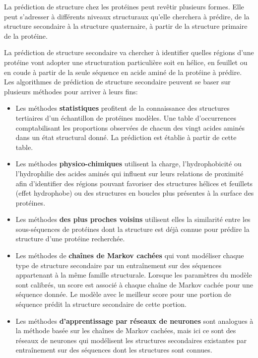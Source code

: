 La prédiction de structure chez les protéines peut revêtir plusieurs formes. Elle peut s'adresser à différents niveaux structuraux qu'elle cherchera à prédire, de la structure secondaire à la structure quaternaire, à partir de la structure primaire de la protéine.

La prédiction de structure secondaire va chercher à identifier quelles régions d'une protéine vont adopter une structuration particulière soit en hélice, en feuillet ou en coude à partir de la seule séquence en acide aminé de la protéine à prédire. Les algorithmes de prédiction de structure secondaire peuvent se baser sur plusieurs méthodes pour arriver à leurs fins:

\begin{itemize}
	\item Les méthodes \textbf{statistiques} profitent de la connaissance des structures tertiaires d'un échantillon de protéines modèles. Une table d'occurrences comptabilisant les proportions observées de chacun des vingt acides aminés dans un état structural donné. La prédiction est établie à partir de cette table.
	\item Les méthodes \textbf{physico-chimiques} utilisent la charge, l'hydrophobicité ou l'hydrophilie des acides aminés qui influent sur leurs relations de proximité afin d'identifier des régions pouvant favoriser des structures hélices et feuillets (effet hydrophobe) ou des structures en boucles plus présentes à la surface des protéines.
	\item Les méthodes \textbf{des plus proches voisins} utilisent elles la similarité entre les sous-séquences de protéines dont la structure est déjà connue pour prédire la structure d'une protéine recherchée.
	\item Les méthodes de \textbf{chaînes de Markov cachées} qui vont modéliser chaque type de structure secondaire par un entraînement sur des séquences appartenant à la même famille structurale. Lorsque les paramètres du modèle sont calibrés, un score est associé à chaque chaîne de Markov cachée pour une séquence donnée. Le modèle avec le meilleur score pour une portion de séquence prédit la structure secondaire de cette portion.
	\item Les méthodes \textbf{d'apprentissage par réseaux de neurones} sont analogues à la méthode basée sur les chaînes de Markov cachées, mais ici ce sont des réseaux de neurones qui modélisent les structures secondaires existantes par entraînement sur des séquences dont les structures sont connues.
\end{itemize}

